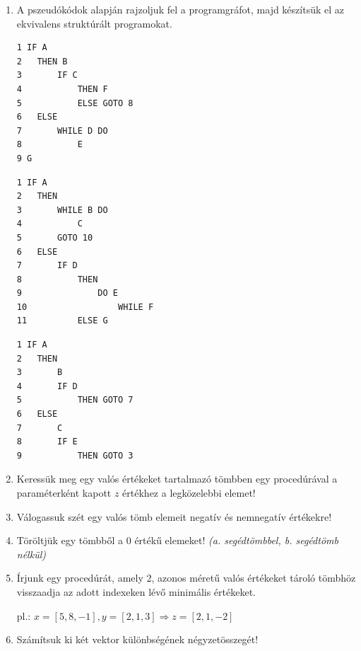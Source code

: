 \documentclass[a4paper]{article}
\begin{document}
\begin{enumerate}
$$
P = \{
START \rightarrow A, A \rightarrow (B, C), B \rightarrow (D, E), C \rightarrow E, D \rightarrow A, E \rightarrow STOP
\}
$$

$$
P = \{
START \rightarrow A, A \rightarrow B, B \rightarrow (C, D), C \rightarrow (B, STOP), D \rightarrow (C, A)
\}
$$

$$
P = \{
START \rightarrow A, A \rightarrow (B, E), B \rightarrow C, C \rightarrow (D, G), D \rightarrow A, E \rightarrow (F, STOP), F \rightarrow G, G \rightarrow STOP
\}
$$

$$
P = \{
START \rightarrow A, A \rightarrow (D, B), B \rightarrow C, C \rightarrow (E, STOP), D \rightarrow F, E \rightarrow A, F \rightarrow (B, C)
\}
$$

\item

A pszeudókódok alapján rajzoljuk fel a programgráfot, majd készítsük el az ekvivalens struktúrált programokat.

\begin{verbatim}
1 IF A
2   THEN B
3       IF C
4           THEN F
5           ELSE GOTO 8
6   ELSE
7       WHILE D DO
8           E
9 G
\end{verbatim}

\begin{verbatim}
1 IF A
2   THEN
3       WHILE B DO
4           C
5       GOTO 10
6   ELSE
7       IF D
8           THEN
9               DO E
10                  WHILE F
11          ELSE G
\end{verbatim}

\begin{verbatim}
1 IF A
2   THEN
3       B
4       IF D
5           THEN GOTO 7
6   ELSE
7       C
8       IF E
9           THEN GOTO 3
\end{verbatim}

\item

Keressük meg egy valós értékeket tartalmazó tömbben egy procedúrával a paraméterként kapott $z$ értékhez a legközelebbi elemet!

\item

Válogassuk szét egy valós tömb elemeit negatív és nemnegatív értékekre!

\item

Töröltjük egy tömbből a 0 értékű elemeket! \textit{(a. segédtömbbel, b. segédtömb nélkül)}

\item

Írjunk egy procedúrát, amely 2, azonos méretű valós értékeket tároló tömbhöz visszaadja az adott indexeken lévő minimális értékeket.

pl.: $x = [5, 8, -1], y = [2, 1, 3] \Rightarrow z = [2, 1, -2]$

\item

Számítsuk ki két vektor különbségének négyzetösszegét!

\end{enumerate}
\end{document}
